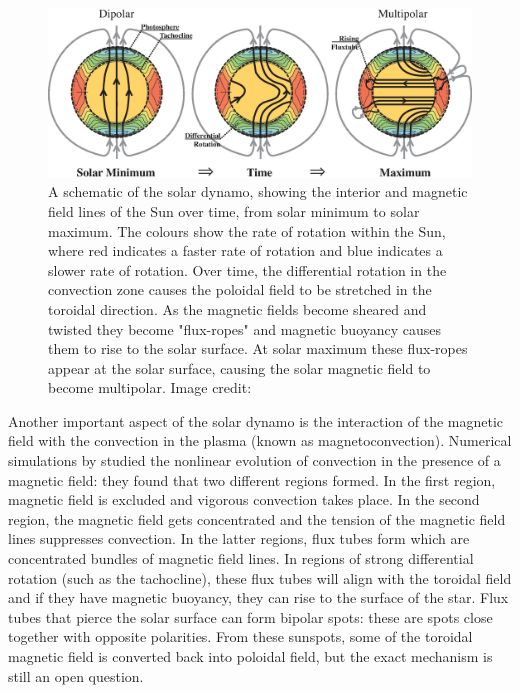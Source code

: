\begin{figure}
    \centering
    \captionsetup{width=.9\linewidth}
    \includegraphics[width=.9\linewidth]{Figures/1-Introduction/dynamo_schem.eps}
    \caption[Schematic of the solar dynamo]{A schematic of the solar dynamo, showing the interior and magnetic field lines of the Sun over time, from solar minimum to solar maximum. The colours show the rate of rotation within the Sun, where red indicates a faster rate of rotation and blue indicates a slower rate of rotation. Over time, the differential rotation in the convection zone causes the poloidal field to be stretched in the toroidal direction. As the magnetic fields become sheared and twisted they become "flux-ropes" and magnetic buoyancy causes them to rise to the solar surface. At solar maximum these flux-ropes appear at the solar surface, causing the solar magnetic field to become multipolar. Image credit: \citet{higgins_2012}}
    \label{fig:dynamo}
\end{figure}

Another important aspect of the solar dynamo is the interaction of the magnetic field with the convection in the plasma (known as magnetoconvection). Numerical simulations by \citet{Weiss_1981} studied the nonlinear evolution of convection in the presence of a magnetic field: they found that two different regions formed. In the first region, magnetic field is excluded and vigorous convection takes place. In the second region, the magnetic field gets concentrated and the tension of the magnetic field lines suppresses convection. In the latter regions, flux tubes form which are concentrated bundles of magnetic field lines. In regions of strong differential rotation (such as the tachocline), these flux tubes will align with the toroidal field and if they have magnetic buoyancy, they can rise to the surface of the star. Flux tubes that pierce the solar surface can form bipolar spots: these are spots close together with opposite polarities. From these sunspots, some of the toroidal magnetic field is converted back into poloidal field, but the exact mechanism is still an open question.

